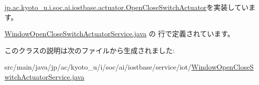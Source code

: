 \hyperlink{interfacejp_1_1ac_1_1kyoto__u_1_1i_1_1soc_1_1ai_1_1iostbase_1_1actuator_1_1_open_close_switch_actuator_a8a9e5dfe1568502663cd3a605ce4d1b2}{jp.\-ac.\-kyoto\-\_\-u.\-i.\-soc.\-ai.\-iostbase.\-actuator.\-Open\-Close\-Switch\-Actuator}を実装しています。



 \hyperlink{_window_open_close_switch_actuator_service_8java_source}{Window\-Open\-Close\-Switch\-Actuator\-Service.\-java} の  行で定義されています。



このクラスの説明は次のファイルから生成されました\-:\begin{DoxyCompactItemize}
\item 
src/main/java/jp/ac/kyoto\-\_\-u/i/soc/ai/iostbase/service/iot/\hyperlink{_window_open_close_switch_actuator_service_8java}{Window\-Open\-Close\-Switch\-Actuator\-Service.\-java}\end{DoxyCompactItemize}
